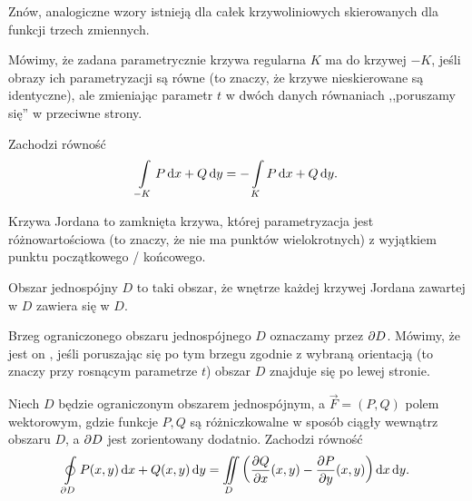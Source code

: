 Znów, analogiczne wzory istnieją dla całek krzywoliniowych skierowanych dla funkcji trzech zmiennych.

Mówimy, że zadana parametrycznie krzywa regularna $K$ ma  do krzywej $-K$, jeśli obrazy ich parametryzacji są równe (to znaczy, że krzywe nieskierowane są identyczne), ale zmieniając parametr $t$ w dwóch danych równaniach ,,poruszamy się'' w przeciwne strony.

\begin{fact}
    \label{f:opposite orientation of a curve}
    Zachodzi równość
    \[ \int\limits_{-K} P \operatorname{d}\!{x} + Q \operatorname{d}\!{y} = -\int\limits_K P \operatorname{d}\!{x} + Q \operatorname{d}\!{y}. \]
\end{fact}

\begin{definition}
    Krzywa Jordana to zamknięta krzywa, której parametryzacja jest różnowartościowa (to znaczy, że nie ma punktów wielokrotnych) z wyjątkiem punktu początkowego / końcowego.
\end{definition}

\begin{definition}
    Obszar jednospójny $D$ to taki obszar, że wnętrze każdej krzywej Jordana zawartej w $D$ zawiera się w $D$.
\end{definition}

Brzeg ograniczonego obszaru jednospójnego $D$ oznaczamy przez $\operatorname{\partial}\!{D}$. Mówimy, że jest on , jeśli poruszając się po tym brzegu zgodnie z wybraną orientacją (to znaczy przy rosnącym parametrze $t$) obszar $D$ znajduje się po lewej stronie.

\begin{theorem}[Greena]
    \label{t:Green}
    Niech $D$ będzie ograniczonym obszarem jednospójnym, a $\vec{F} = (P, Q)$ polem wektorowym, gdzie funkcje $P, Q$ są różniczkowalne w sposób ciągły wewnątrz obszaru $D$, a $\operatorname{\partial}\!{D}$ jest zorientowany dodatnio. Zachodzi równość
    \[ \oint\limits_{\p D} P(x, y) \d x + Q(x, y) \d y = \iint\limits_D \left(\frac{\p Q}{\p x}(x, y) - \frac{\p P}{\p y}(x, y)\right) \d x \d y. \]
\end{theorem}

